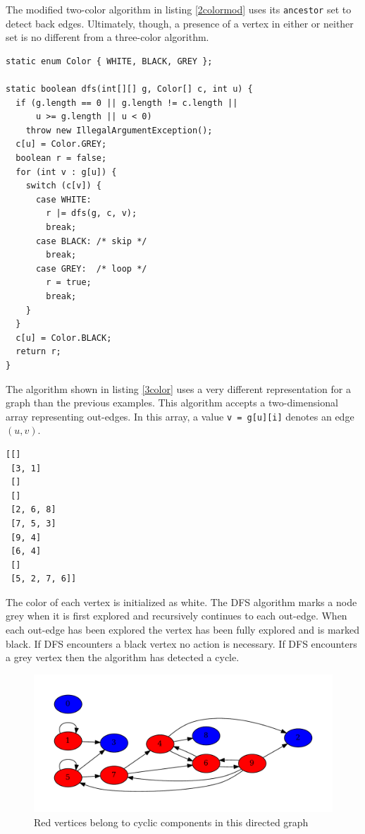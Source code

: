 \documentclass{book}
\begin{document}
The modified two-color algorithm in listing \ref{2colormod} uses its \texttt{ancestor} set to detect back edges. Ultimately, though, a presence of a vertex in either or neither set is no different from a three-color algorithm.

\begin{lstlisting}[columns=fixed,caption={DFS algorithm with three colors},label={3color}]
static enum Color { WHITE, BLACK, GREY };

static boolean dfs(int[][] g, Color[] c, int u) {
  if (g.length == 0 || g.length != c.length ||
      u >= g.length || u < 0)
    throw new IllegalArgumentException();
  c[u] = Color.GREY;
  boolean r = false;
  for (int v : g[u]) {
    switch (c[v]) {
      case WHITE:
      	r |= dfs(g, c, v);
      	break;
      case BLACK: /* skip */
      	break;
      case GREY:  /* loop */
      	r = true;
      	break;
    }
  }
  c[u] = Color.BLACK;
  return r;
}
\end{lstlisting}

The algorithm shown in listing \ref{3color} uses a very different representation for a graph than the previous examples. This algorithm accepts a two-dimensional array representing out-edges. In this array, a value \texttt{v = g[u][i]} denotes an edge $(u,v)$.

\begin{lstlisting}[caption={A two-dimensional array representing the graph shown in figure \ref{redblue}}]
[[]
 [3, 1]
 []
 []
 [2, 6, 8]
 [7, 5, 3]
 [9, 4]
 [6, 4]
 []
 [5, 2, 7, 6]]
 \end{lstlisting}

The color of each vertex is initialized as white. The DFS algorithm marks a node grey when it is first explored and recursively continues to each out-edge. When each out-edge has been explored the vertex has been fully explored and is marked black. If DFS encounters a black vertex no action is necessary. If DFS encounters a grey vertex then the algorithm has detected a cycle.

\begin{figure}
\centering
\includegraphics[width=\columnwidth]{figures/redblue}
\caption{Red vertices belong to cyclic components in this directed graph}
\label{redblue}
\end{figure}
\end{document}

